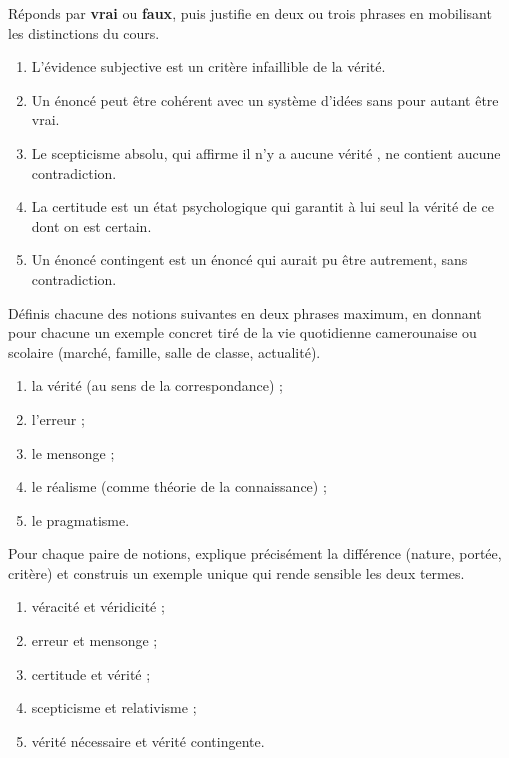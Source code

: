 \documentclass[11pt]{article}
\newcommand{\cle}[1]{{\popxbold\color{popdark}#1}}
\begin{document}
\begin{exercice}
Réponds par \textbf{vrai} ou \textbf{faux}, puis justifie en deux ou trois phrases en mobilisant les distinctions du cours.
\begin{enumerate}
\item L'évidence subjective est un critère infaillible de la vérité.
\item Un énoncé peut être cohérent avec un système d'idées sans pour autant être vrai.
\item Le scepticisme absolu, qui affirme \guillemotleft il n'y a aucune vérité \guillemotright, ne contient aucune contradiction.
\item La certitude est un état psychologique qui garantit à lui seul la vérité de ce dont on est certain.
\item Un énoncé contingent est un énoncé qui aurait pu être autrement, sans contradiction.
\end{enumerate}
\end{exercice}

\begin{exercice}
Définis chacune des notions suivantes en deux phrases maximum, en donnant pour chacune un exemple concret tiré de la vie quotidienne camerounaise ou scolaire (marché, famille, salle de classe, actualité).
\begin{enumerate}
\item la vérité (au sens de la correspondance) ;
\item l'erreur ;
\item le mensonge ;
\item le réalisme (comme théorie de la connaissance) ;
\item le pragmatisme.
\end{enumerate}
\end{exercice}

\begin{exercice}
Pour chaque paire de notions, explique précisément la différence (nature, portée, critère) et construis un exemple unique qui rende sensible les deux termes.
\begin{enumerate}
\item \cle{véracité} et \cle{véridicité} ;
\item \cle{erreur} et \cle{mensonge} ;
\item \cle{certitude} et \cle{vérité} ;
\item \cle{scepticisme} et \cle{relativisme} ;
\item vérité \cle{nécessaire} et vérité \cle{contingente}.
\end{enumerate}
\end{exercice}
\end{document}
